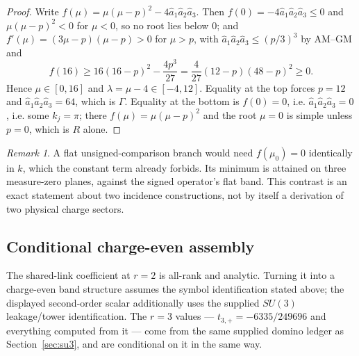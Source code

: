 \documentclass[11pt]{article}
\theoremstyle{plain}
\theoremstyle{definition}
\theoremstyle{remark}
\newtheorem{remark}[theorem]{Remark}
\newcommand{\chk}[1]{}
\begin{document}
\begin{proof}
Write $f(\mu)=\mu(\mu-p)^2-4\hat a_1\hat a_2\hat a_3$. Then
$f(0)=-4\hat a_1\hat a_2\hat a_3\le0$ and $\mu(\mu-p)^2<0$ for $\mu<0$, so no
root lies below $0$; and $f'(\mu)=(3\mu-p)(\mu-p)>0$ for $\mu>p$, with
$\hat a_1\hat a_2\hat a_3\le(p/3)^3$ by AM--GM and
\[
 f(16)\ge16(16-p)^2-\frac{4p^3}{27}
 =\frac4{27}(12-p)(48-p)^2\ge0.
\]
Hence $\mu\in[0,16]$ and
$\lambda=\mu-4\in[-4,12]$. Equality at the top forces $p=12$ and
$\hat a_1\hat a_2\hat a_3=64$, which is $\Gamma$. Equality at the bottom is
$f(0)=0$, i.e. $\hat a_1\hat a_2\hat a_3=0$, i.e. some $k_j=\pi$; there
$f(\mu)=\mu(\mu-p)^2$ and the root $\mu=0$ is simple unless $p=0$, which is
$R$ alone.
\end{proof}
\chk{the C-even range [-4, 12] is exact, and each edge is attained at one point only}
\chk{the C-even band touches its floor exactly on the three planes k\_j = pi}

\begin{remark}
A flat unsigned-comparison branch would need $f(\mu_0)=0$ identically in $k$,
which the constant term already forbids. Its minimum is attained on three
measure-zero planes, against the signed operator's flat band. This contrast is
an exact statement about two incidence constructions, not by itself a
derivation of two physical charge sectors.
\chk{the C-even band touches its floor exactly on the three planes k\_j = pi}
\chk{the C-even spectra at the four high-symmetry momenta}
\end{remark}

\subsection{Conditional charge-even assembly}

The shared-link coefficient at $r=2$ is all-rank and analytic. Turning it into
a charge-even band structure assumes the symbol identification stated above;
the displayed second-order scalar additionally uses the supplied
$SU(3)$ leakage/tower identification. The $r=3$ values ---
$t_{3,+}=-6335/249696$ and everything computed from it --- come from the same
supplied domino ledger as Section~\ref{sec:su3}, and are conditional on it in
the same way.
\end{document}
